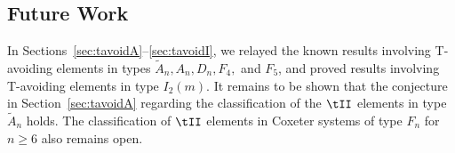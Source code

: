 %
%
%

\subsection{Future Work}\label{sec:open}
In Sections~\ref{sec:tavoidA}--\ref{sec:tavoidI}, we relayed the known results involving T-avoiding elements in types $\widetilde{A}_n, A_n, D_n, F_4,$ and $F_5$, and proved results involving T-avoiding elements in type $I_2(m)$. It remains to be shown that the conjecture in Section~\ref{sec:tavoidA} regarding the classification of the $\tII$ elements in type $\widetilde{A}_n$ holds. The classification of $\tII$ elements in Coxeter systems of type $F_n$ for $n \geq 6$ also remains open.

